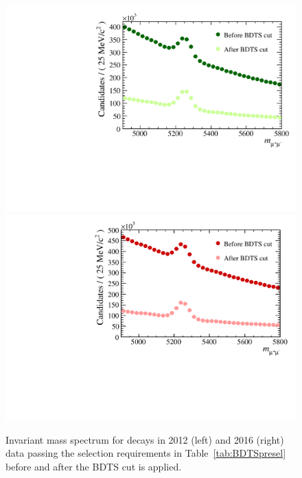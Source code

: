\begin{figure}[htbp]
    \centering
        \includegraphics[width= 0.49 \textwidth]{./Figs/Selection/BDTS_impact_2012.pdf}
        \includegraphics[width= 0.49 \textwidth]{./Figs/Selection/BDTS_impact_2016.pdf}

    \caption{Invariant mass spectrum for \bhh decays in 2012 (left) and 2016 (right) data passing the selection requirements in Table~\ref{tab:BDTSpresel} before and after the BDTS cut is applied.}
    \label{fig:BDTSpreformance}
\end{figure}

